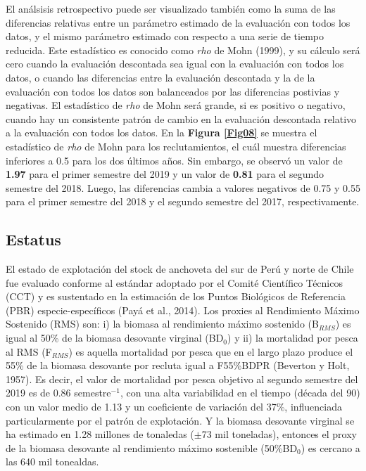 \documentclass[letter,11pt]{article}
\begin{document}
El an\'alsisis retrospectivo puede ser visualizado tambi\'en como la suma de las diferencias
relativas entre un par\'ametro estimado de la evaluaci\'on con todos los datos, y el mismo
par\'ametro estimado con respecto a una serie de tiempo reducida. Este estad\'istico es
conocido como \textit{rho} de Mohn (1999), y su c\'alculo ser\'a cero cuando la evaluaci\'on
descontada sea igual con la evaluaci\'on con todos los datos, o cuando las diferencias
entre la evaluaci\'on descontada y la de la evaluaci\'on con todos los datos son balanceados
por las diferencias postivias y negativas. El estad\'istico de \textit{rho} de Mohn ser\'a
grande, si es positivo o negativo, cuando hay un consistente patr\'on de cambio en la
evaluaci\'on descontada relativo a la evaluaci\'on con todos los datos. En la \textbf{Figura 
\ref{Fig08}} se muestra el estad\'istico de \textit{rho} de Mohn para los reclutamientos, el
cu\'al muestra diferencias inferiores a 0.5 para los dos \'ultimos a\~{n}os. Sin embargo,
se observ\'o un valor de \textbf{1.97} para el primer semestre del 2019 y un valor de \textbf{0.81}
para el segundo semestre del 2018. Luego, las diferencias cambia a valores negativos de 0.75 y
0.55 para el primer semestre del 2018 y el segundo semestre del 2017, respectivamente.\\




\subsection{Estatus}

El estado de explotaci\'on del stock de anchoveta del sur de Per\'u y norte
de Chile fue evaluado conforme al est\'andar adoptado por el Comit\'e
Cient\'ifico T\'ecnicos (CCT) y es sustentado en la estimaci\'on de los Puntos
Biol\'ogicos de Referencia (PBR) especie-espec\'ificos (Pay\'a et al., 2014). Los proxies al
Rendimiento M\'aximo Sostenido (RMS) son: i) la biomasa al rendimiento
m\'aximo sostenido (B$_{RMS}$) es igual al 50\% de la biomasa desovante
virginal (BD$_{0}$) y ii) la mortalidad por pesca al RMS (F$_{RMS}$)
es aquella mortalidad por pesca que en el largo plazo produce el 55\% de
la biomasa desovante por recluta igual a F55\%BDPR (Beverton y Holt,
1957). Es decir, el valor de mortalidad por pesca objetivo al segundo
semestre del 2019 es de 0.86 semestre$^{-1}$, con una alta variabilidad en
el tiempo (d\'ecada del 90) con un valor medio de 1.13 y un coeficiente de 
variaci\'on del 37\%, influenciada particularmente por el patr\'on de 
explotaci\'on. Y la biomasa desovante virginal se ha estimado en 1.28 millones
de tonaledas ($\pm$73 mil toneladas), entonces el proxy de la biomasa desovante al
rendimiento m\'aximo sostenible (50\%BD$_{0}$) es cercano a las 640 mil tonealdas.\\
\end{document}
